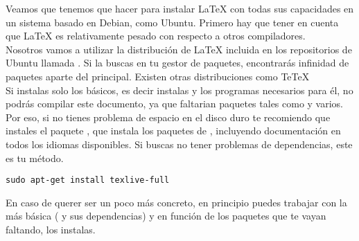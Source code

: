 

Veamos que tenemos que hacer para instalar \LaTeX{} con todas sus
capacidades en un sistema basado en Debian, como Ubuntu.
Primero hay que tener en cuenta que \LaTeX{} es relativamente pesado
con respecto a otros compiladores. \\

Nosotros vamos a utilizar la distribución de \LaTeX{} incluida en los
repositorios de Ubuntu llamada . Si la buscas en
tu gestor de paquetes, encontrarás infinidad de paquetes aparte
del principal. Existen otras distribuciones como Te\TeX\\

Si instalas solo los básicos, es decir instalas  y
los programas necesarios para él, no podrás compilar este documento,
ya que faltarian paquetes tales como  y
varios. Por eso, si no tienes problema de espacio en el disco duro te
recomiendo que instales el paquete , que
instala  los paquetes de , incluyendo
documentación en todos los idiomas disponibles. Si buscas no tener
problemas de dependencias, este es tu método.\\

\begin{lstlisting}[style=consola]
  sudo apt-get install texlive-full
\end{lstlisting}

En caso de querer ser un poco más concreto, en principio puedes
trabajar con la más básica ( y sus dependencias) y
en función de los paquetes que te vayan faltando, los instalas.

